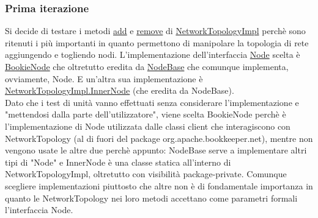\documentclass[10pt, a4paper]{article}
\begin{document}
	\subsubsection{Prima iterazione}
	Si decide di testare i metodi 
	\href{https://bookkeeper.apache.org/docs/latest/api/javadoc/org/apache/bookkeeper/net/NetworkTopologyImpl.html#add(org.apache.bookkeeper.net.Node)}{add} e 
	\href{https://bookkeeper.apache.org/docs/latest/api/javadoc/org/apache/bookkeeper/net/NetworkTopologyImpl.html#remove(org.apache.bookkeeper.net.Node)}{remove}
	di \href{https://bookkeeper.apache.org/docs/latest/api/javadoc/org/apache/bookkeeper/net/NetworkTopologyImpl.html}{NetworkTopologyImpl} 
	perchè sono ritenuti i più importanti in quanto permettono di manipolare la topologia di rete aggiungendo e togliendo nodi.
	L'implementazione dell'interfaccia
	\href{https://bookkeeper.apache.org/docs/latest/api/javadoc/org/apache/bookkeeper/net/Node.html}{Node} scelta è
	\href{https://bookkeeper.apache.org/docs/latest/api/javadoc/org/apache/bookkeeper/net/BookieNode.html}{BookieNode} che oltretutto eredita da 
	\href{https://bookkeeper.apache.org/docs/latest/api/javadoc/org/apache/bookkeeper/net/NodeBase.html}{NodeBase} 
	che comunque implementa, ovviamente, Node. E un'altra sua implementazione è
	\href{https://bookkeeper.apache.org/docs/latest/api/javadoc/org/apache/bookkeeper/net/NetworkTopologyImpl.InnerNode.html}{NetworkTopologyImpl.InnerNode} (che eredita da NodeBase).
	\\
	Dato che i test di unità vanno effettuati senza considerare l'implementazione e "mettendosi dalla parte dell'utilizzatore", viene scelta BookieNode perchè è l'implementazione di 
	Node utilizzata dalle classi client che interagiscono con NetworkTopology (al di fuori del package org.apache.bookkeeper.net), mentre non vengono usate le altre due perchè appunto: 
	NodeBase serve a implementare altri tipi di "Node" e InnerNode è una classe statica all'interno di NetworkTopologyImpl, oltretutto con visibilità package-private.
	Comunque scegliere implementazioni piuttosto che altre non è di fondamentale importanza in quanto le NetworkTopology nei loro metodi accettano come parametri formali l'interfaccia Node.
	
\end{document}
